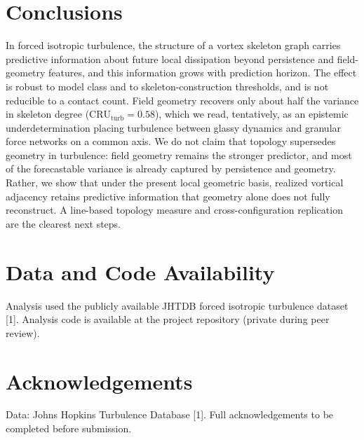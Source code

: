 \documentclass[11pt,a4paper]{article}
\begin{document}
\section{Conclusions}
In forced isotropic turbulence, the structure of a vortex skeleton graph carries predictive information about future local dissipation beyond persistence and field-geometry features, and this information grows with prediction horizon. The effect is robust to model class and to skeleton-construction thresholds, and is not reducible to a contact count. Field geometry recovers only about half the variance in skeleton degree ($\mathrm{CRU}_{\text{turb}} = 0.58$), which we read, tentatively, as an epistemic underdetermination placing turbulence between glassy dynamics and granular force networks on a common axis. We do not claim that topology supersedes geometry in turbulence: field geometry remains the stronger predictor, and most of the forecastable variance is already captured by persistence and geometry. Rather, we show that under the present local geometric basis, realized vortical adjacency retains predictive information that geometry alone does not fully reconstruct. A line-based topology measure and cross-configuration replication are the clearest next steps.

\section*{Data and Code Availability}
Analysis used the publicly available JHTDB forced isotropic turbulence dataset [1]. Analysis code is available at the project repository (private during peer review).

\section*{Acknowledgements}
Data: Johns Hopkins Turbulence Database [1]. Full acknowledgements to be completed before submission.
\end{document}

